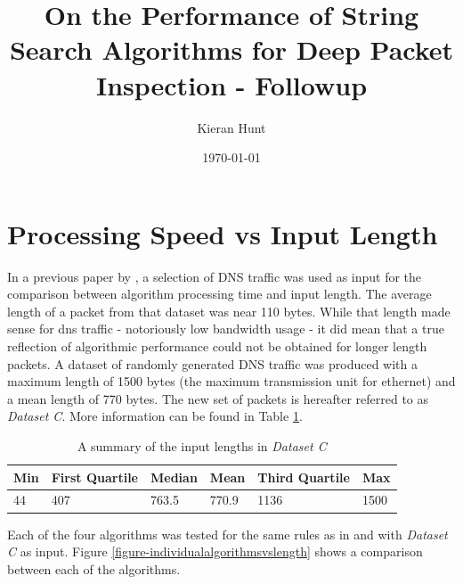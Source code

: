 \documentclass[11pt]{article}
\begin{document}
\title{On the Performance of String Search Algorithms for Deep Packet Inspection - Followup}
\author{Kieran Hunt}
\date{\today}
\maketitle


\section{Processing Speed vs Input Length} \label{sec-processingspeecvsinputlength}

In a previous paper by \citet{hunt2016}, a selection of DNS traffic was used as input for the comparison between algorithm processing time and input length. The average length of a packet from that dataset was near 110 bytes. While that length made sense for dns traffic - notoriously low bandwidth usage - it did mean that a true reflection of algorithmic performance could not be obtained for longer length packets. A dataset of randomly generated DNS traffic was produced with a maximum length of 1500 bytes (the maximum transmission unit for ethernet) and a mean length of 770 bytes. The new set of packets is hereafter referred to as \textit{Dataset C}. More information can be found in Table \ref{table-datasetcinputlengthsummary}.

\begin{table}[!htb]
\centering
\begin{tabular}{@{}llllll@{}}
\toprule
Min & First Quartile & Median & Mean & Third Quartile & Max \\ \midrule
44 & 407 & 763.5 & 770.9 & 1136 & 1500 \\ \bottomrule
\end{tabular}
\caption{A summary of the input lengths in \textit{Dataset C}}
\label{table-datasetcinputlengthsummary}
\end{table}

Each of the four algorithms was tested for the same rules as in \citet{hunt2016} and with \textit{Dataset C} as input. Figure \ref{figure-individualalgorithmsvslength} shows a comparison between each of the algorithms.
\end{document}
